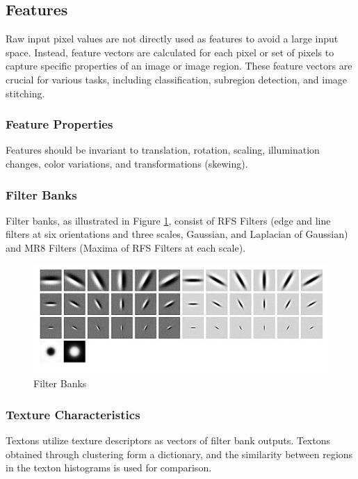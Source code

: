 \subsection{Features}

Raw input pixel values are not directly used as features to avoid a large input space.
Instead, feature vectors are calculated for each pixel or set of pixels to capture specific properties of an image or image region.
These feature vectors are crucial for various tasks, including classification, subregion detection, and image stitching.

\subsubsection{Feature Properties}

Features should be invariant to translation, rotation, scaling, illumination changes, color variations, and transformations (skewing).

\subsubsection{Filter Banks}

Filter banks, as illustrated in Figure \ref{fig:filter_bank},
consist of RFS Filters (edge and line filters at six orientations and three scales, Gaussian, and Laplacian of Gaussian)
and MR8 Filters (Maxima of RFS Filters at each scale).

\begin{figure}[h]
	\centering
	\includegraphics[width=0.6\linewidth]{img/filter_bank}
	\caption{Filter Banks}
	\label{fig:filter_bank}
\end{figure}

\subsubsection{Texture Characteristics}

Textons utilize texture descriptors as vectors of filter bank outputs. Textons obtained through clustering form a dictionary,
and the similarity between regions in the texton histograms is used for comparison.

